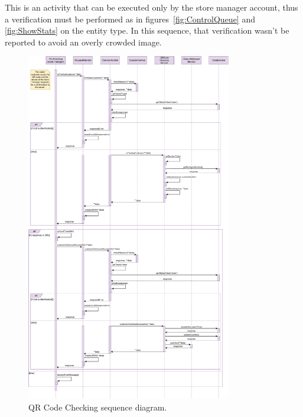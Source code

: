 This is an activity that can be executed only by the store manager account, thus a verification must be performed as in figures~\ref{fig:ControlQueue} and \ref{fig:ShowStats} on the entity type. In this sequence, that verification wasn't be reported to avoid an overly crowded image.

\begin{figure}[H]
	\centering
	\includegraphics[width=0.8\textwidth]{images/qrCodeChecking_sequence_diagram.pdf}
	\caption{QR Code Checking sequence diagram.}\label{fig:QRCodeChecking}
\end{figure}

